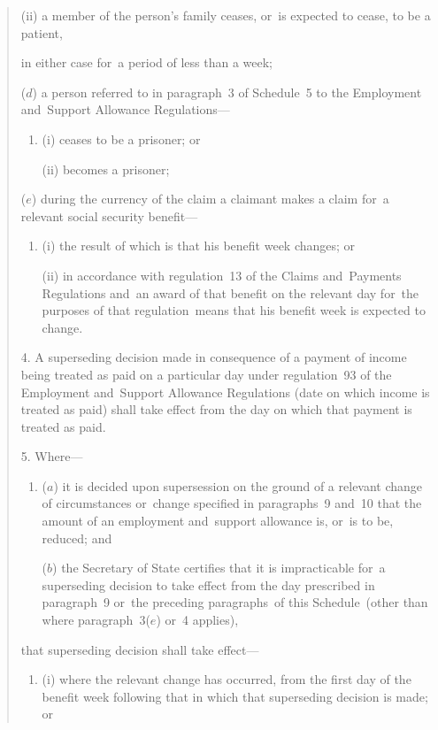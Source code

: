 \documentclass[12pt,a4paper]{article}
\begin{document}
\begin{quotation}
\begin{enumerate}
\begin{enumerate}
(ii) a member of the person’s family ceases, or~is expected to cease, to be a patient,
\end{enumerate}
in either case for~a period of less than a week;

($d$) a person referred to in paragraph~3 of Schedule~5 to the Employment and~Support Allowance Regulations—
\begin{enumerate}\item[]
(i) ceases to be a prisoner; or

(ii) becomes a prisoner;
\end{enumerate}

($e$) during the currency of the claim a claimant makes a claim for~a relevant social security benefit—
\begin{enumerate}\item[]
(i) the result of which is that his benefit week changes; or

(ii) in accordance with regulation~13 of the Claims and~Payments Regulations and~an award of that benefit on the relevant day for~the purposes of that regulation~means that his benefit week is expected to change.
\end{enumerate}
\end{enumerate}

\medskip

4.  A superseding decision made in consequence of a payment of income being treated as paid on a particular day under regulation~93 of the Employment and~Support Allowance Regulations (date on which income is treated as paid) shall take effect from the day on which that payment is treated as paid.

\medskip

5.  Where—
\begin{enumerate}\item[]
($a$) it is decided upon supersession on the ground of a relevant change of circumstances or~change specified in paragraphs~9 and~10 that the amount of an employment and~support allowance is, or~is to be, reduced; and

($b$) the Secretary of State certifies that it is impracticable for~a superseding decision to take effect from the day prescribed in paragraph~9 or~the preceding paragraphs~of this Schedule~(other than where paragraph~3($e$)  or~4 applies),
\end{enumerate}
that superseding decision shall take effect—
\begin{enumerate}\item[]
(i) where the relevant change has occurred, from the first day of the benefit week following that in which that superseding decision is made; or


\end{enumerate}
\end{quotation}
\end{document}
